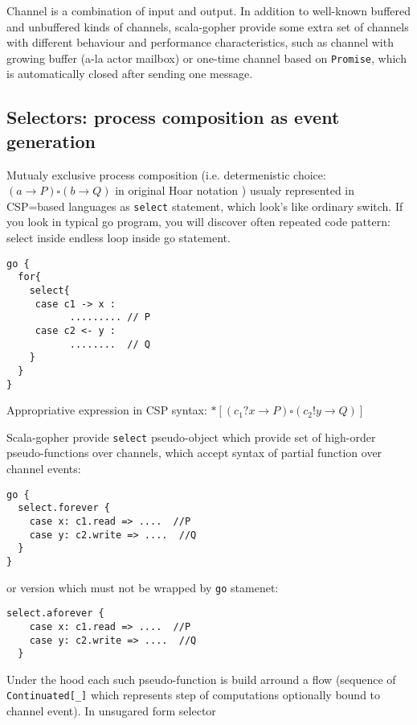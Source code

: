 \documentclass[12pt]{article}
\begin{document}
  Channel is a combination of input and output. In addition to well-known buffered and unbuffered 
kinds of channels, scala-gopher provide some extra set of channels with different behaviour and performance characteristics,
 such as channel with growing buffer (a-la actor mailbox) or one-time channel based on \verb|Promise|, which is automatically closed after sending one message.

\subsection{Selectors: process composition as event generation}

 Mutualy exclusive process composition (i.e. determenistic choice: $(a \to P)\square(b\to Q)$ in original Hoar notation )  usualy represented in CSP=based languages as \verb|select| statement, which look's like ordinary switch. If you look in typical go program, you will discover often repeated code pattern: select inside endless loop inside go statement.

\begin{Verbatim}[fontsize=\small]
go {
  for{
    select{
     case c1 -> x :
           ......... // P
     case c2 <- y :
           ........  // Q
    }
  }
}
\end{Verbatim}

  Appropriative expression in CSP syntax: $*[(c_{1} ? x \to P)\square(c_{2} ! y \to Q)]$

 Scala-gopher provide \verb|select| pseudo-object which provide set of high-order pseudo-functions over
channels, which accept syntax of partial function over channel events:

\begin{Verbatim}[fontsize=\small]
go {   
  select.forever {
    case x: c1.read => ....  //P
    case y: c2.write => ....  //Q
  }
}
\end{Verbatim}
   
  or version which must not be wrapped by \verb|go| stamenet:

\begin{Verbatim}[fontsize=\small]
  select.aforever {
    case x: c1.read => ....  //P
    case y: c2.write => ....  //Q
  }
\end{Verbatim}
   
  Under the hood each such pseudo-function is build arround a flow (sequence of \verb|Continuated[_]| which represents step of computations optionally bound to channel event).  In unsugared form selector 
\end{document}

